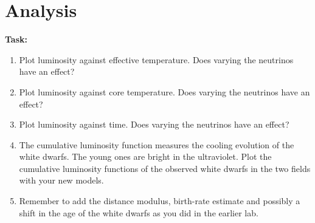 \documentclass{article}
\begin{document}
\section{Analysis}

\textbf{Task:}\vspace{-1em}
\begin{enumerate}
 \setlength\itemsep{0em}
\item Plot luminosity against effective temperature.  Does varying the neutrinos have an effect?
\item Plot luminosity against core temperature.  Does varying the neutrinos have an effect?
\item Plot luminosity against time.  Does varying the neutrinos have an effect?
 \item 
 The cumulative luminosity function measures the cooling evolution of the white dwarfs.  The young ones are bright in the ultraviolet.  Plot the cumulative luminosity functions of the observed white dwarfs in the two fields with your new models. 
 \item Remember to add the distance modulus, birth-rate estimate and possibly a shift in the age of the white dwarfs as you did in the earlier lab.
\end{enumerate}
\end{document}
